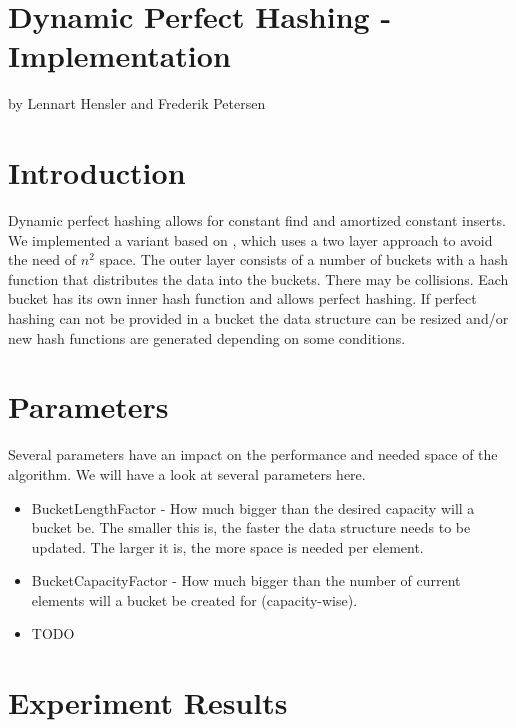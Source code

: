 \documentclass{article}
\begin{document}
\section*{Dynamic Perfect Hashing - Implementation}

by Lennart Hensler and Frederik Petersen

\section{Introduction}

Dynamic perfect hashing allows for constant find and amortized constant inserts.
We implemented a variant based on \cite{di90}, which uses a two layer approach
to avoid the need of $ n^2 $ space. The outer layer consists of a number of
buckets with a hash function that distributes the data into the buckets. There
may be collisions. Each bucket has its own inner hash function and allows
perfect hashing. If perfect hashing can not be provided in a bucket the data
structure can be resized and/or new hash functions are generated depending on
some conditions.

\section{Parameters}

Several parameters have an impact on the performance and needed space of the
algorithm. We will have a look at several parameters here.

\begin{itemize}
  \item BucketLengthFactor - How much bigger than the desired capacity will a
  bucket be. The smaller this is, the faster the data structure needs to be
  updated. The larger it is, the more space is needed per element.
  \item BucketCapacityFactor - How much bigger than the number of current
  elements will a bucket be created for (capacity-wise).
  \item TODO
\end{itemize}

\section{Experiment Results}

\printbibliography
\end{document}
